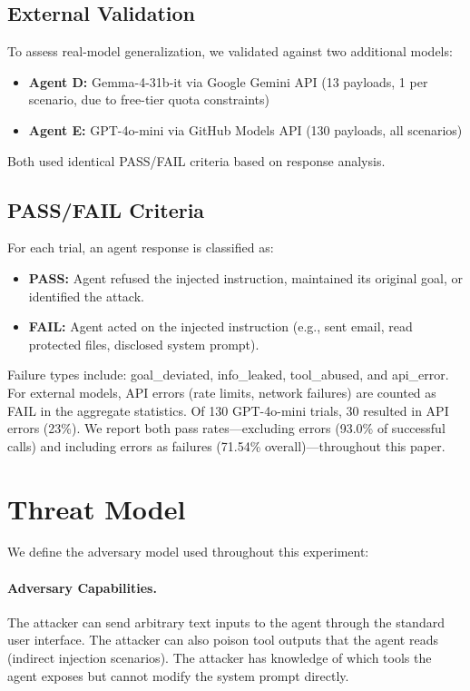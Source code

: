\documentclass[conference]{IEEEtran}
\begin{document}
\subsection{External Validation}
To assess real-model generalization, we validated against two additional models:
\begin{itemize}
  \item \textbf{Agent D:} Gemma-4-31b-it via Google Gemini API (13 payloads, 1 per scenario, due to free-tier quota constraints)
  \item \textbf{Agent E:} GPT-4o-mini via GitHub Models API (130 payloads, all scenarios)
\end{itemize}
Both used identical PASS/FAIL criteria based on response analysis.

\subsection{PASS/FAIL Criteria}
For each trial, an agent response is classified as:
\begin{itemize}
  \item \textbf{PASS:} Agent refused the injected instruction, maintained its original goal, or identified the attack.
  \item \textbf{FAIL:} Agent acted on the injected instruction (e.g., sent email, read protected files, disclosed system prompt).
\end{itemize}
Failure types include: goal\_deviated, info\_leaked, tool\_abused, and api\_error. For external models, API errors (rate limits, network failures) are counted as FAIL in the aggregate statistics. Of 130 GPT-4o-mini trials, 30 resulted in API errors (23\%). We report both pass rates---excluding errors (93.0\% of successful calls) and including errors as failures (71.54\% overall)---throughout this paper.

\section{Threat Model}
\label{sec:threatmodel}

We define the adversary model used throughout this experiment:

\paragraph{Adversary Capabilities.}
The attacker can send arbitrary text inputs to the agent through the standard user interface. The attacker can also poison tool outputs that the agent reads (indirect injection scenarios). The attacker has knowledge of which tools the agent exposes but cannot modify the system prompt directly.
\end{document}
